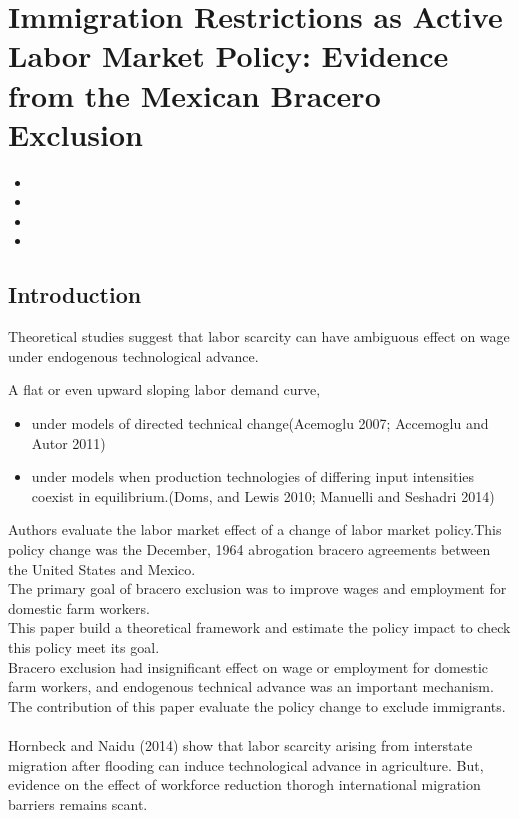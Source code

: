 \documentclass[../root]{subfiles}
\begin{document}
    \chapter{Immigration Restrictions as Active Labor Market Policy: Evidence from the Mexican Bracero Exclusion}

    \begin{shortsummary}
        \begin{itemize}
            \item {} 
            \item {}
            \item {}
            \item {}
        \end{itemize}
    \end{shortsummary}

    \section{Introduction}
    Theoretical studies suggest that labor scarcity can have ambiguous effect on wage under endogenous  technological advance.
    
    A flat or even upward sloping labor demand curve,
    \begin{itemize}
        \item under models of directed technical change(Acemoglu 2007; Accemoglu and Autor 2011)
        \item under models when production technologies of differing input intensities coexist in equilibrium.(Doms, and Lewis 2010; Manuelli and Seshadri 2014)  
    \end{itemize}
    
    Authors evaluate the labor market effect of a change of  labor market policy.This policy change was the December, 1964 abrogation  bracero agreements between the United States and Mexico.  \\
    The primary goal of bracero exclusion was to improve wages and employment for domestic farm workers. \\
    This paper build a theoretical framework and estimate the policy impact to check this policy meet its goal. \\
    Bracero exclusion had insignificant effect on wage or employment for domestic farm workers, and endogenous technical advance was an important mechanism. \\
    The contribution of this paper evaluate the policy change to exclude immigrants. 　\\
    Hornbeck and Naidu (2014) show that labor scarcity arising from interstate migration after flooding can induce technological advance in agriculture. But, evidence on the effect of workforce reduction thorogh international migration barriers remains scant.
     
\end{document}
